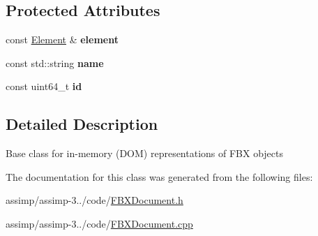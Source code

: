\subsection*{Protected Attributes}
\begin{DoxyCompactItemize}
\item 
\hypertarget{class_assimp_1_1_f_b_x_1_1_object_ac3327ae5fc4da3fc7cd5a7874a99e976}{const \hyperlink{class_assimp_1_1_f_b_x_1_1_element}{Element} \& {\bfseries element}}\label{class_assimp_1_1_f_b_x_1_1_object_ac3327ae5fc4da3fc7cd5a7874a99e976}

\item 
\hypertarget{class_assimp_1_1_f_b_x_1_1_object_a65793c0b22dbe066e5d9380a98fcda8d}{const std\+::string {\bfseries name}}\label{class_assimp_1_1_f_b_x_1_1_object_a65793c0b22dbe066e5d9380a98fcda8d}

\item 
\hypertarget{class_assimp_1_1_f_b_x_1_1_object_a9486eea8d19506ba79ae7b37a10e47a6}{const uint64\+\_\+t {\bfseries id}}\label{class_assimp_1_1_f_b_x_1_1_object_a9486eea8d19506ba79ae7b37a10e47a6}

\end{DoxyCompactItemize}


\subsection{Detailed Description}
Base class for in-\/memory (D\+O\+M) representations of F\+B\+X objects 

The documentation for this class was generated from the following files\+:\begin{DoxyCompactItemize}
\item 
assimp/assimp-\/3../code/\hyperlink{_f_b_x_document_8h}{F\+B\+X\+Document.\+h}\item 
assimp/assimp-\/3../code/\hyperlink{_f_b_x_document_8cpp}{F\+B\+X\+Document.\+cpp}\end{DoxyCompactItemize}
